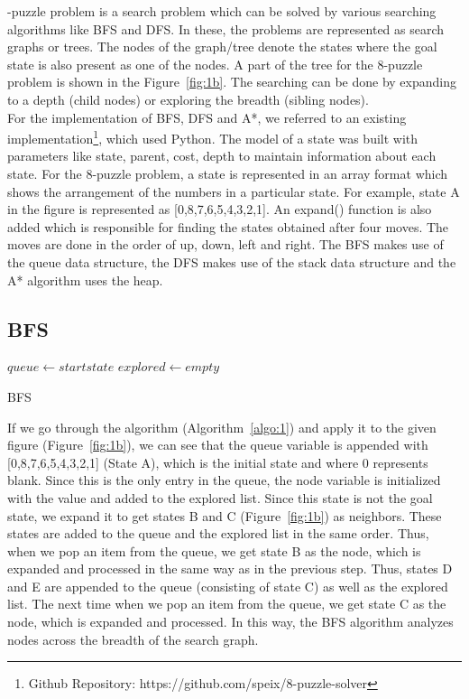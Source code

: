 \documentclass{svproc}
\begin{document}
-puzzle problem is a search problem which can be solved by various searching algorithms like BFS and DFS. In these, the problems are represented as search graphs or trees. The nodes of the graph/tree denote the states where the goal state is also present as one of the nodes. A part of the tree for the 8-puzzle problem is shown in the Figure~\ref{fig:1b}. The searching can be done by expanding to a depth (child nodes) or exploring the breadth (sibling nodes). \\

\noindent For the implementation of BFS, DFS and A*, we referred to an existing implementation\footnote{Github Repository: https://github.com/speix/8-puzzle-solver}, which used Python. The model of a state was built with parameters like state, parent, cost, depth to maintain information about each state. For the 8-puzzle problem, a state is represented in an array format which shows the arrangement of the numbers in a particular state. For example, state A in the figure is represented as [0,8,7,6,5,4,3,2,1]. An expand() function is also added which is responsible for finding the states obtained after four moves. The moves are done in the order of up, down, left and right. The BFS makes use of the queue data structure, the DFS makes use of the stack data structure and the A* algorithm uses the heap.

\subsection{BFS}
\setlength{\intextsep}{5pt}
\begin{algorithm}
	\SetAlgoLined
	 $queue \gets start state$\;
	 $explored \gets empty$\;
	\caption{BFS}
	\label{algo:1}
\end{algorithm}

\noindent If we go through the algorithm (Algorithm~\ref{algo:1}) and apply it to the given figure (Figure~\ref{fig:1b}), we can see that the queue variable is appended with [0,8,7,6,5,4,3,2,1] (State A), which is the initial state and where 0 represents blank. Since this is the only entry in the queue, the node variable is initialized with the value and added to the explored list. Since this state is not the goal state, we expand it to get states B and C (Figure~\ref{fig:1b}) as neighbors. These states are added to the queue and the explored list in the same order. Thus, when we pop an item from the queue, we get state B as the node, which is expanded and processed in the same way as in the previous step. Thus, states D and E are appended to the queue (consisting of state C) as well as the explored list. The next time when we pop an item from the queue, we get state C as the node, which is expanded and processed. In this way, the BFS algorithm analyzes nodes across the breadth of the search graph.
\end{document}
